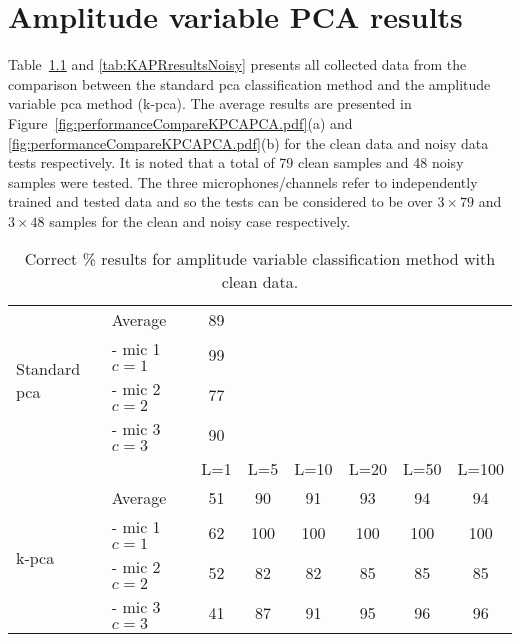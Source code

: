 \chapter{Amplitude variable PCA results}\label{ap:KPCAresults}
Table~\ref{tab:KAPRresultsClean} and \ref{tab:KAPRresultsNoisy} presents all collected data from the comparison between the standard \gls{pca} classification method and the amplitude variable \gls{pca} method (\gls{k-pca}). The average results are presented in Figure~\ref{fig:performanceCompareKPCAPCA.pdf}(a) and \ref{fig:performanceCompareKPCAPCA.pdf}(b) for the clean data and noisy data tests respectively. It is noted that a total of 79 clean samples and 48 noisy samples were tested. The three microphones/channels refer to independently trained and tested data and so the tests can be considered to be over $3 \times 79$ and $3 \times 48$ samples for the clean and noisy case respectively.

\def\baselinestretch{1.2}
\begin{table}[!b]\begin{center}
\caption{Correct \% results for amplitude variable classification method with clean data.}
\label{tab:KAPRresultsClean}
\begin{tabular}{|l|l|c|c|c|c|c|c|}\cline{1-3}
\multirow{4}{*}{Standard \gls{pca}}   & Average           & 89        & \multicolumn{5}{c}{ } \\ \cline{2-3}
                                & - mic 1 $c = 1$   & 99        & \multicolumn{5}{c}{ } \\
                                & - mic 2 $c = 2$   & 77        & \multicolumn{5}{c}{ } \\
                                & - mic 3 $c = 3$   & 90        & \multicolumn{5}{c}{ } \\ \hline
                                &                   & L=1       & L=5   & L=10  & L=20  & L=50  & L=100 \\ \hline
\multirow{4}{*}{\gls{k-pca}}& Average           & 51        & 90    & 91    & 93    & 94    & 94    \\ \cline{2-8}
                                & - mic 1 $c = 1$   & 62        & 100   & 100   & 100   & 100   & 100   \\
                                & - mic 2 $c = 2$   & 52        & 82    & 82    & 85    & 85    & 85    \\
                                & - mic 3 $c = 3$   & 41        & 87    & 91    & 95    & 96    & 96    \\ \hline
\end{tabular}\end{center}\end{table}


